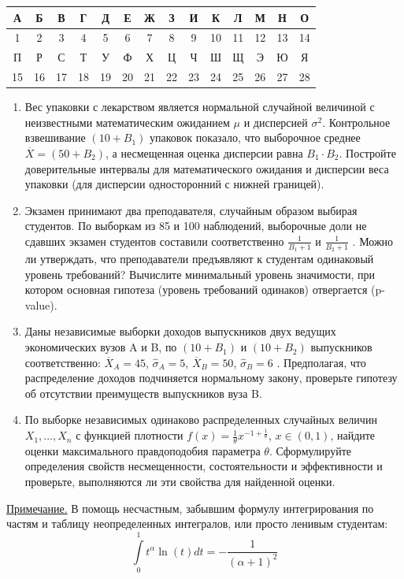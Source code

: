 \documentclass[12pt, a4paper]{article}\usepackage[]{graphicx}\usepackage[]{color}
\begin{document}
\begin{center}
\begin{tabular}{|c|c|c|c|c|c|c|c|c|c|c|c|c|c|}
\hline  А & Б & В & Г & Д & Е & Ж & З & И & К & Л & М & Н & О \\
\hline 1 & 2 & 3 & 4 & 5 & 6 & 7 & 8 & 9 & 10 & 11 & 12 & 13 & 14 \\
\hline  П & Р & С & Т & У & Ф & Х & Ц & Ч & Ш & Щ & Э & Ю & Я \\
\hline 15& 16  &  17 &  18&  19&  20&  21& 22 & 23 &  24& 25 & 26  &  27 & 28 \\
\hline
\end{tabular}
\end{center}
\begin{enumerate}
\item Вес упаковки с лекарством является нормальной случайной величиной с неизвестными математическим ожиданием  $\mu$ и дисперсией $\sigma^2$. Контрольное взвешивание $(10+B_1)$ упаковок показало, что выборочное среднее  $\overline{X} = (50+B_2)$, а  несмещенная оценка дисперсии равна $B_1\cdot B_2$. Постройте  доверительные интервалы для математического ожидания и дисперсии веса упаковки (для дисперсии односторонний с нижней границей).

\item Экзамен принимают два преподавателя, случайным образом выбирая студентов.  По выборкам из 85 и 100 наблюдений, выборочные доли не сдавших экзамен студентов составили соответственно $\frac{1}{B_1+1}$ и $\frac{1}{B_2+1}$ . Можно ли утверждать, что преподаватели предъявляют к студентам одинаковый уровень требований? Вычислите минимальный уровень значимости, при котором основная гипотеза (уровень требований одинаков) отвергается (p-value).

\item Даны независимые выборки доходов выпускников двух ведущих экономических вузов A и B, по $(10+B_1)$ и $(10+B_2)$ выпускников соответственно: $\overline{X}_A=45$, $\hat{\sigma}_A=5$, $\overline{X}_B=50$, $\hat{\sigma}_B=6$ .
Предполагая, что распределение доходов подчиняется нормальному закону, проверьте гипотезу об отсутствии преимуществ выпускников вуза B.

\item 	По выборке независимых одинаково распределенных случайных величин\\ $X_1,\dots,X_n$ с функцией плотности $f(x)=\frac{1}{\theta} x^{-1+\frac{1}{\theta}}$, $x\in(0, 1)$, найдите оценки максимального правдоподобия параметра $\theta$. Сформулируйте определения свойств несмещенности, состоятельности и эффективности и проверьте, выполняются ли эти свойства для найденной оценки.
\end{enumerate}
\underline{Примечание.} В помощь несчастным, забывшим формулу интегрирования по частям и таблицу неопределенных интегралов, или просто ленивым студентам:
$$
\int\limits_{0}^1 t^\alpha \ln (t) dt = -\frac{1}{(\alpha+1)^2}
$$
\end{document}
